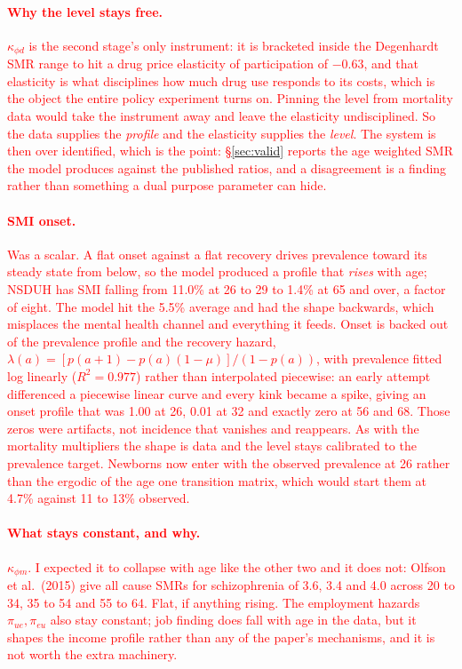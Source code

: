 \documentclass[11pt]{article}
\newcommand{\nw}[1]{\textcolor{red}{#1}}
\begin{document}
\nw{\paragraph{Why the level stays free.} $\kappa_{\phi d}$ is the second
stage's only instrument: it is bracketed inside the Degenhardt SMR range to hit
a drug price elasticity of participation of $-0.63$, and that elasticity is what
disciplines how much drug use responds to its costs, which is the object the
entire policy experiment turns on. Pinning the level from mortality data would
take the instrument away and leave the elasticity undisciplined. So the data
supplies the \emph{profile} and the elasticity supplies the \emph{level}. The
system is then over identified, which is the point: \S\ref{sec:valid} reports
the age weighted SMR the model produces against the published ratios, and a
disagreement is a finding rather than something a dual purpose parameter can
hide.}

\nw{\paragraph{SMI onset.} Was a scalar. A flat onset against a flat recovery
drives prevalence toward its steady state from below, so the model produced a
profile that \emph{rises} with age; NSDUH has SMI falling from 11.0\% at 26 to
29 to 1.4\% at 65 and over, a factor of eight. The model hit the 5.5\% average
and had the shape backwards, which misplaces the mental health channel and
everything it feeds. Onset is backed out of the prevalence profile and the
recovery hazard, $\lambda(a)=[p(a{+}1)-p(a)(1-\mu)]/(1-p(a))$, with prevalence
fitted log linearly ($R^2=0.977$) rather than interpolated piecewise: an early
attempt differenced a piecewise linear curve and every kink became a spike,
giving an onset profile that was 1.00 at 26, 0.01 at 32 and exactly zero at 56
and 68. Those zeros were artifacts, not incidence that vanishes and reappears.
As with the mortality multipliers the shape is data and the level stays
calibrated to the prevalence target. Newborns now enter with the observed
prevalence at 26 rather than the ergodic of the age one transition matrix, which
would start them at 4.7\% against 11 to 13\% observed.}

\nw{\paragraph{What stays constant, and why.} $\kappa_{\phi m}$. I expected it to
collapse with age like the other two and it does not: Olfson et al.\ (2015) give
all cause SMRs for schizophrenia of 3.6, 3.4 and 4.0 across 20 to 34, 35 to 54
and 55 to 64. Flat, if anything rising. The employment hazards
$\pi_{ue},\pi_{eu}$ also stay constant; job finding does fall with age in the
data, but it shapes the income profile rather than any of the paper's
mechanisms, and it is not worth the extra machinery.}
\end{document}
